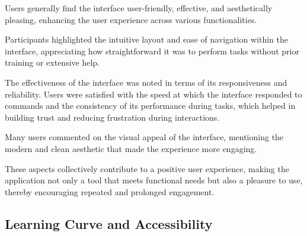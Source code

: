 Users generally find the interface user-friendly, effective, and aesthetically pleasing, enhancing the user experience across various functionalities. 

Participants highlighted the intuitive layout and ease of navigation within the interface, appreciating how straightforward it was to perform tasks without prior training or extensive help. 
\cite{P1, P2, P4, P5, P7, P8, P10}

 
The effectiveness of the interface was noted in terms of its responsiveness and reliability. 
Users were satisfied with the speed at which the interface responded to commands and the consistency of its performance during tasks, which helped in building trust and reducing frustration during interactions.
\cite{P2, P4, P7, P8, P10}



Many users commented on the visual appeal of the interface, mentioning the modern and clean aesthetic that made the experience more engaging. 
\cite{P7, P8, P10}


These aspects collectively contribute to a positive user experience, making the application not only a tool that meets functional needs but also a pleasure to use, thereby encouraging repeated and prolonged engagement.

\subsection*{Learning Curve and Accessibility}
\label{sec:results:learning_curve_accessibility}

